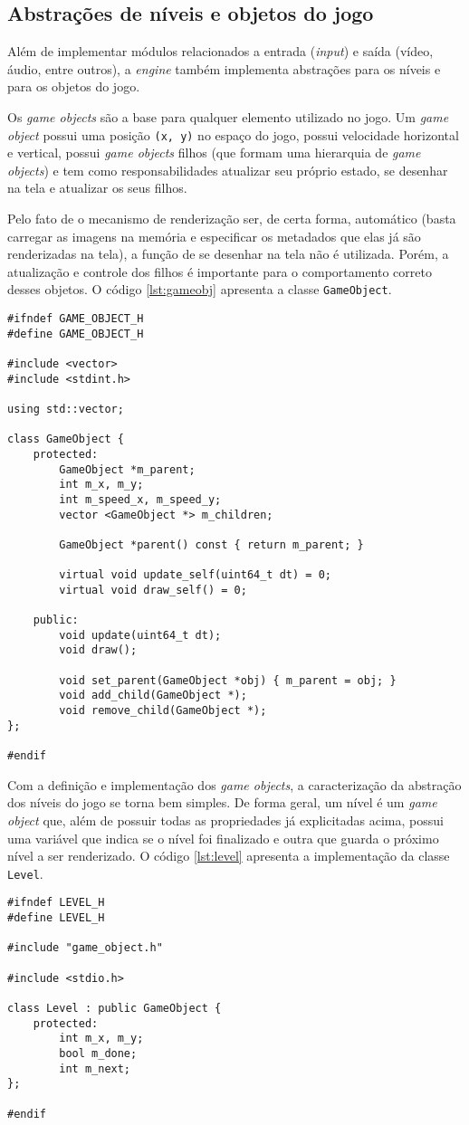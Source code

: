 \subsection{Abstrações de níveis e objetos do jogo}

Além de implementar módulos relacionados a entrada (\textit{input}) e saída (vídeo, áudio, entre outros), a \textit{engine} também implementa abstrações para os níveis e para os objetos do jogo.

Os \textit{game objects} são a base para qualquer elemento utilizado no jogo. Um \textit{game object} possui uma posição \texttt{(x, y)} no espaço do jogo, possui velocidade horizontal e vertical, possui \textit{game objects} filhos (que formam uma hierarquia de \textit{game objects}) e tem como responsabilidades atualizar seu próprio estado, se desenhar na tela e atualizar os seus filhos.

Pelo fato de o mecanismo de renderização ser, de certa forma, automático (basta carregar as imagens na memória e especificar os metadados que elas já são renderizadas na tela), a função de se desenhar na tela não é utilizada. Porém, a atualização e controle dos filhos é importante para o comportamento correto desses objetos. O código \ref{lst:gameobj} apresenta a classe \texttt{GameObject}.

\begin{lstlisting}[float,label={lst:gameobj},caption={Classe \texttt{GameObject}}]
#ifndef GAME_OBJECT_H
#define GAME_OBJECT_H

#include <vector>
#include <stdint.h>

using std::vector;

class GameObject {
    protected:
        GameObject *m_parent;
        int m_x, m_y;
        int m_speed_x, m_speed_y;
        vector <GameObject *> m_children;

        GameObject *parent() const { return m_parent; }

        virtual void update_self(uint64_t dt) = 0;
        virtual void draw_self() = 0;

    public:
        void update(uint64_t dt);
        void draw();

        void set_parent(GameObject *obj) { m_parent = obj; }
        void add_child(GameObject *);
        void remove_child(GameObject *);
};

#endif
\end{lstlisting}

Com a definição e implementação dos \textit{game objects}, a caracterização da abstração dos níveis do jogo se torna bem simples. De forma geral, um nível é um \textit{game object} que, além de possuir todas as propriedades já explicitadas acima, possui uma variável que indica se o nível foi finalizado e outra que guarda o próximo nível a ser renderizado. O código \ref{lst:level} apresenta a implementação da classe \texttt{Level}.

\begin{lstlisting}[label={lst:level},caption={Classe \texttt{Level}}]
#ifndef LEVEL_H
#define LEVEL_H

#include "game_object.h"

#include <stdio.h>

class Level : public GameObject {
    protected:
        int m_x, m_y;
        bool m_done;
        int m_next;
};

#endif
\end{lstlisting}